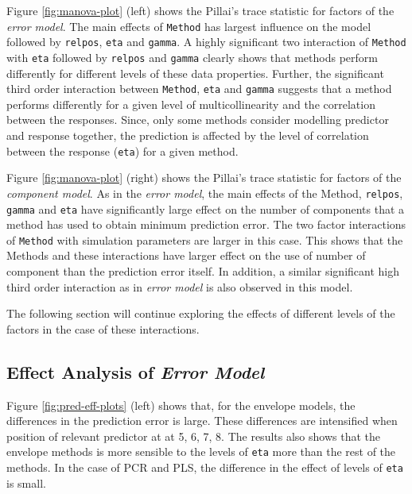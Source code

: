 \documentclass[12pt,3p,authoryear]{elsarticle}
\providecommand{\tightlist}{%
  \setlength{\itemsep}{0pt}\setlength{\parskip}{0pt}}
\begin{document}
\begin{description}
\tightlist
\item[\emph{Error Model}:]
Figure \ref{fig:manova-plot} (left) shows the Pillai's trace statistic
for factors of the \emph{error model}. The main effects of
\texttt{Method} has largest influence on the model followed by
\texttt{relpos}, \texttt{eta} and \texttt{gamma}. A highly significant
two interaction of \texttt{Method} with \texttt{eta} followed by
\texttt{relpos} and \texttt{gamma} clearly shows that methods perform
differently for different levels of these data properties. Further, the
significant third order interaction between \texttt{Method},
\texttt{eta} and \texttt{gamma} suggests that a method performs
differently for a given level of multicollinearity and the correlation
between the responses. Since, only some methods consider modelling
predictor and response together, the prediction is affected by the level
of correlation between the response (\texttt{eta}) for a given method.
\item[\emph{Component Model}:]
Figure \ref{fig:manova-plot} (right) shows the Pillai's trace statistic
for factors of the \emph{component model}. As in the \emph{error model},
the main effects of the Method, \texttt{relpos}, \texttt{gamma} and
\texttt{eta} have significantly large effect on the number of components
that a method has used to obtain minimum prediction error. The two
factor interactions of \texttt{Method} with simulation parameters are
larger in this case. This shows that the Methods and these interactions
have larger effect on the use of number of component than the prediction
error itself. In addition, a similar significant high third order
interaction as in \emph{error model} is also observed in this model.
\end{description}

The following section will continue exploring the effects of different
levels of the factors in the case of these interactions.

\subsection{\texorpdfstring{Effect Analysis of \emph{Error
Model}}{Effect Analysis of Error Model}}\label{effect-analysis-of-error-model}

Figure \ref{fig:pred-eff-plots} (left) shows that, for the envelope
models, the differences in the prediction error is large. These
differences are intensified when position of relevant predictor at at 5,
6, 7, 8. The results also shows that the envelope methods is more
sensible to the levels of \texttt{eta} more than the rest of the
methods. In the case of PCR and PLS, the difference in the effect of
levels of \texttt{eta} is small.
\end{document}
